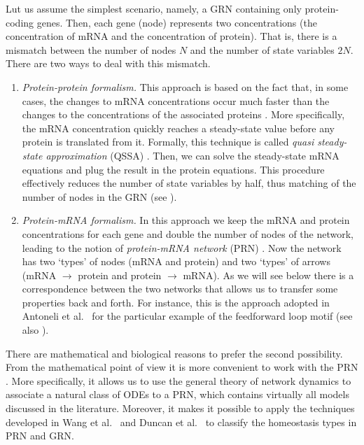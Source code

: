 \documentclass[a4paper,fleqn]{cas-dc}
\newcommand{\etal}{\textrm{et al.}}
\begin{document}
Lut us assume the simplest scenario, namely, a GRN containing only protein-coding genes.
Then, each gene (node) represents two concentrations (the concentration of mRNA and the concentration of protein). 
That is, there is a mismatch between the number of nodes $N$ and the number of state variables $2N$.
There are two ways to deal with this mismatch.
\begin{enumerate}[(1)]
\item {\it Protein-protein formalism.} This approach is based on the fact that, in some cases, the changes to mRNA concentrations occur much faster than the changes to the concentrations of the associated proteins \cite{phb2009}. 
More specifically, the mRNA concentration quickly reaches a steady-state value before any protein is translated from it.
Formally, this technique is called {\em quasi steady-state approximation} (QSSA) \cite{snowden2017}.
Then, we can solve the steady-state mRNA equations and plug the result in the protein equations.
This procedure effectively reduces the number of state variables by half, thus matching of the number of nodes in the GRN (see \cite{ks2008,rs2017a,rs2017b,shi2017}).

\item {\it Protein-mRNA formalism.}
In this approach we keep the mRNA and protein concentrations for each gene and double the number of nodes of the network, leading to the notion of {\em protein-mRNA network} (PRN) \cite{phb2009,mszt2016}.
Now the network has two `types' of nodes (mRNA and protein) and two `types' of arrows (mRNA $\to$ protein and protein $\to$ mRNA).
As we will see below there is a correspondence between the two networks that allows us to transfer some properties back and forth. 
For instance, this is the approach adopted in Antoneli \etal~\cite{antoneli2018} for the particular example of the feedforward loop motif (see also \cite{kebc2005}).
\end{enumerate}

There are mathematical and biological reasons to prefer the second possibility.
From the mathematical point of view it is more convenient to work with the PRN \cite{mrs2023}. 
More specifically, it allows us to use the general theory of network dynamics \cite{gs2023} to associate a natural class of ODEs to a PRN, which contains virtually all models discussed in the literature. 
Moreover, it makes it possible to apply the techniques developed in Wang \etal~\cite{wang2021} and Duncan \etal~\cite{duncan2024} to classify the homeostasis types in PRN and GRN.
\end{document}
